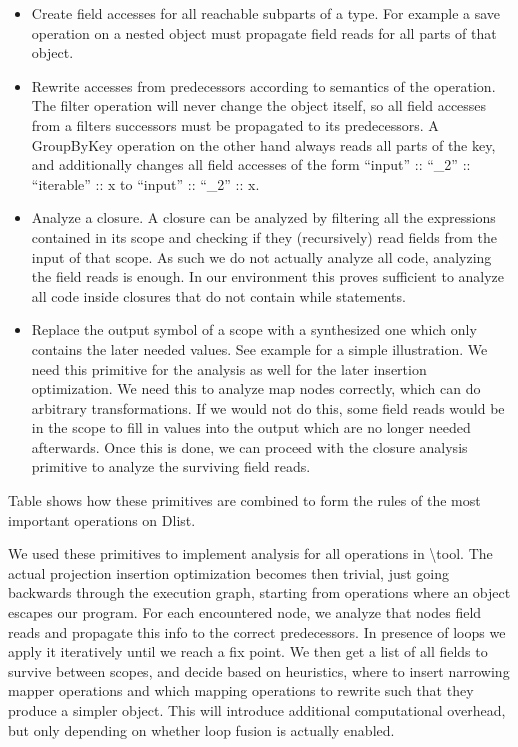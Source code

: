 \begin{itemize}
\item Create field accesses for all reachable subparts of a type. For example a save operation on a nested object must
propagate field reads for all parts of that object.
\item Rewrite accesses from predecessors according to semantics of the operation. The filter operation will never change the object itself, so all field accesses from a filters successors must be propagated to its predecessors. A GroupByKey
operation on the other hand always reads all parts of the key, and additionally changes all field accesses of the form
``input'' :: ``\_2'' :: ``iterable'' :: x to ``input'' :: ``\_2'' :: x. \ 
\item Analyze a closure. A closure can be analyzed by filtering all the expressions contained in its scope and checking
if they (recursively) read fields from the input of that scope. As such we do not actually analyze all code, analyzing
the field reads is enough. In our environment this proves sufficient to analyze all code inside closures that do not
contain while statements.
\item Replace the output symbol of a scope with a synthesized one which only contains the later needed values. See
example \todo{sample} for a simple illustration. We need this primitive for the analysis as well for the later insertion
optimization. We need this to analyze map nodes correctly, which can do arbitrary transformations. If we would not do
this, some field reads would be in the scope to fill in values into the output which are no longer needed afterwards.
Once this is done, we can proceed with the closure analysis primitive to analyze the surviving field reads.
\end{itemize}
Table  shows how these primitives are combined to form the rules of the most important operations on Dlist.

We used these primitives to implement analysis for all operations in {\textbackslash}tool. The actual projection
insertion optimization becomes then trivial, just going backwards through the execution graph, starting from operations
where an object escapes our program. For each encountered node, we analyze that nodes field reads and propagate this
info to the correct predecessors. In presence of loops we apply it iteratively until we reach a fix point. We then get
a list of all fields to survive between scopes, and decide based on heuristics, where to insert narrowing mapper
operations and which mapping operations to rewrite such that they produce a simpler object. This will introduce
additional computational overhead, but only depending on whether loop fusion is actually enabled. 


